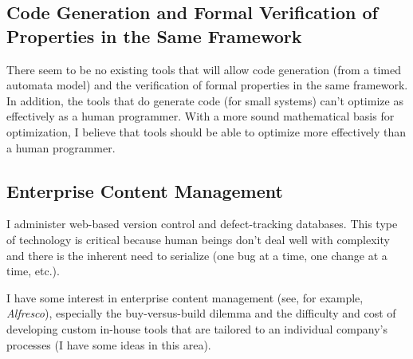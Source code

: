 \documentclass[letterpaper,10pt,titlepage]{article}
\begin{document}

\subsection{Code Generation and Formal Verification of Properties in the Same Framework}
\label{srin0:sgvs0}

There seem to be no existing tools that will allow code generation (from
a timed automata model) and the
verification of formal properties in the same framework.  In addition, the tools
that do generate code (for small systems) can't optimize as effectively as a 
human programmer.  With a more sound mathematical basis for optimization,
I believe that tools should be able to optimize more effectively
than a human programmer.


\subsection{Enterprise Content Management}
\label{srin0:secm0}

I administer web-based version control and defect-tracking databases.  This type of
technology is critical because human beings don't deal well with complexity and 
there is the inherent need to serialize (one bug at a time, one change at a time, etc.).

I have some interest in enterprise content management
(see, for example, \emph{Alfresco}), especially the
buy-versus-build dilemma and the difficulty
and cost of developing custom in-house tools that are tailored to an individual
company's processes (I have some ideas in this area).


\end{document}
